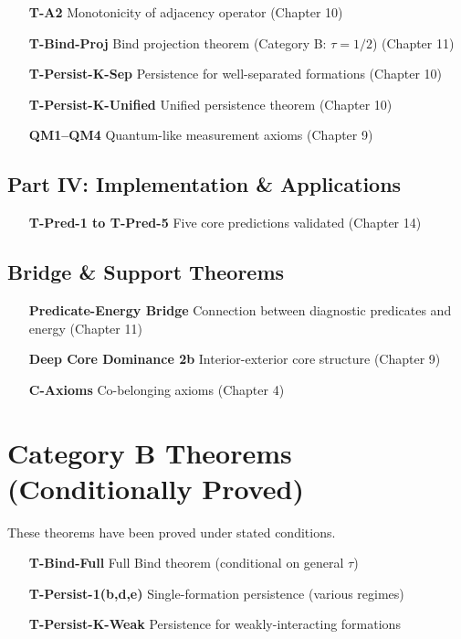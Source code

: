 \begin{enumerate}
  \item[\textbf{T-A2}] Monotonicity of adjacency operator (Chapter 10)
  \item[\textbf{T-Bind-Proj}] Bind projection theorem (Category B: $\tau=1/2$) (Chapter 11)
  \item[\textbf{T-Persist-K-Sep}] Persistence for well-separated formations (Chapter 10)
  \item[\textbf{T-Persist-K-Unified}] Unified persistence theorem (Chapter 10)
  \item[\textbf{QM1--QM4}] Quantum-like measurement axioms (Chapter 9)
\end{enumerate}

\subsection*{Part IV: Implementation \& Applications}

\begin{enumerate}
  \item[\textbf{T-Pred-1 to T-Pred-5}] Five core predictions validated (Chapter 14)
\end{enumerate}

\subsection*{Bridge \& Support Theorems}

\begin{enumerate}
  \item[\textbf{Predicate-Energy Bridge}] Connection between diagnostic predicates and energy (Chapter 11)
  \item[\textbf{Deep Core Dominance 2b}] Interior-exterior core structure (Chapter 9)
  \item[\textbf{C-Axioms}] Co-belonging axioms (Chapter 4)
\end{enumerate}

\section*{Category B Theorems (Conditionally Proved)}

These theorems have been proved under stated conditions.

\begin{enumerate}
  \item[\textbf{T-Bind-Full}] Full Bind theorem (conditional on general $\tau$)
  \item[\textbf{T-Persist-1(b,d,e)}] Single-formation persistence (various regimes)
  \item[\textbf{T-Persist-K-Weak}] Persistence for weakly-interacting formations
\end{enumerate}

